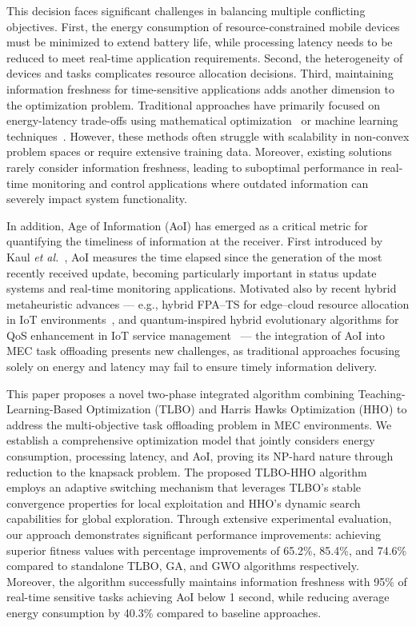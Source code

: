 \documentclass[conference]{IEEEtran}
\begin{document}
This decision faces significant challenges in balancing multiple conflicting objectives. First, the energy consumption of resource-constrained mobile devices must be minimized to extend battery life, while processing latency needs to be reduced to meet real-time application requirements. Second, the heterogeneity of devices and tasks complicates resource allocation decisions. Third, maintaining information freshness for time-sensitive applications adds another dimension to the optimization problem. Traditional approaches have primarily focused on energy-latency trade-offs using mathematical optimization~\cite{wang2017joint} or machine learning techniques~\cite{wang2021deep}. However, these methods often struggle with scalability in non-convex problem spaces or require extensive training data. Moreover, existing solutions rarely consider information freshness, leading to suboptimal performance in real-time monitoring and control applications where outdated information can severely impact system functionality.

In addition, Age of Information (AoI) has emerged as a critical metric for quantifying the timeliness of information at the receiver. First introduced by Kaul \textit{et al.}~\cite{kaul2012real}, AoI measures the time elapsed since the generation of the most recently received update, becoming particularly important in status update systems and real-time monitoring applications. Motivated also by recent hybrid metaheuristic advances — e.g., hybrid FPA–TS for edge–cloud resource allocation in IoT environments~\cite{Dankolo_2025}, and quantum‑inspired hybrid evolutionary algorithms for QoS enhancement in IoT service management~\cite{Singh_2025} — the integration of AoI into MEC task offloading presents new challenges, as traditional approaches focusing solely on energy and latency may fail to ensure timely information delivery.

This paper proposes a novel two-phase integrated algorithm combining Teaching-Learning-Based Optimization (TLBO) and Harris Hawks Optimization (HHO) to address the multi-objective task offloading problem in MEC environments. We establish a comprehensive optimization model that jointly considers energy consumption, processing latency, and AoI, proving its NP-hard nature through reduction to the knapsack problem. The proposed TLBO-HHO algorithm employs an adaptive switching mechanism that leverages TLBO's stable convergence properties for local exploitation and HHO's dynamic search capabilities for global exploration. Through extensive experimental evaluation, our approach demonstrates significant performance improvements: achieving superior fitness values with percentage improvements of 65.2\%, 85.4\%, and 74.6\% compared to standalone TLBO, GA, and GWO algorithms respectively. Moreover, the algorithm successfully maintains information freshness with 95\% of real-time sensitive tasks achieving AoI below 1 second, while reducing average energy consumption by 40.3\% compared to baseline approaches.
\end{document}
